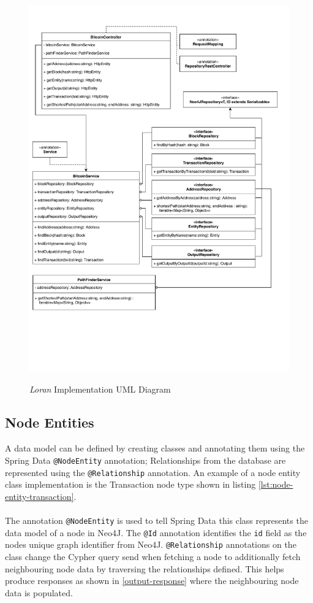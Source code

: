 \begin{figure}
  \centering
  \includegraphics[width = 15cm]{./figures/backend-uml.pdf}\\[0.5cm] 
  \caption{\textit{Loran} Implementation UML Diagram}
  \label{fig:backend-uml}
\end{figure} 

\subsection{Node Entities}
A data model can be defined by creating classes and annotating them using the Spring Data \texttt{@NodeEntity} annotation; Relationships from the database are represented using the \texttt{@Relationship} annotation. An example of a node entity class implementation is the Transaction node type shown in listing \ref{lst:node-entity-transaction}.
\\\\
The annotation \texttt{@NodeEntity} is used to tell Spring Data this class represents the data model of a node in Neo4J. The \texttt{@Id} annotation identifies the \texttt{id} field as the nodes unique graph identifier from Neo4J. \texttt{@Relationship} annotations on the class change the Cypher query send when fetching a node to additionally fetch neighbouring node data by traversing the relationships defined. This helps produce responses as shown in \ref{output-response} where the neighbouring node data is populated. 

